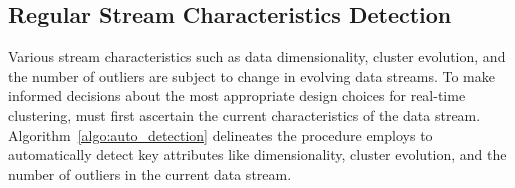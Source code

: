 



\subsection{Regular Stream Characteristics Detection}
\label{subsec:regular-detection}
Various stream characteristics such as data dimensionality, cluster evolution, and the number of outliers are subject to change in evolving data streams. To make informed decisions about the most appropriate design choices for real-time clustering, \algo must first ascertain the current characteristics of the data stream. Algorithm~\ref{algo:auto_detection} delineates the procedure \algo employs to automatically detect key attributes like dimensionality, cluster evolution, and the number of outliers in the current data stream.

